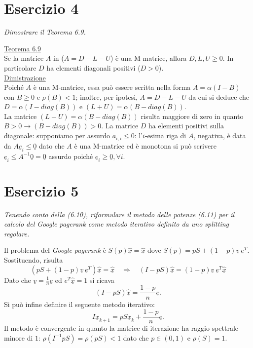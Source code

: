 
\section{Esercizio 4}
\label{sub:es4}
\emph{Dimostrare il Teorema 6.9.}
\begin{sol}
  \underline{Teorema 6.9}\\
  Se la matrice $A$ in ($A=D-L-U$) è una M-matrice, allora $D,L,U\geq 0$.
   In particolare $D$ ha elementi diagonali positivi ($D>0$).\\
  \underline{Dimistrazione}\\
  Poiché $A$ è una M-matrice, essa può essere scritta nella forma $A=\alpha(I-B)$ con $B\geq 0$ e $\rho(B)<1$;
   inoltre, per ipotesi, $A=D-L-U$ da cui si deduce che $D=\alpha(I-diag(B))$ e $(L+U)=\alpha(B-diag(B))$.\\
  La matrice $(L+U)=\alpha(B-diag(B))$ risulta maggiore di zero in quanto $B>0\rightarrow (B-diag(B))>0$.
  La matrice $D$ ha elementi positivi sulla diagonale: supponiamo per assurdo $a_{i,i}\leq 0$:
    l'$i$-esima riga di $A$, negativa, è data da $A\underline{e}_i\leq\underline{0}$ dato che $A$ è una M-matrice ed è monotona si può scrivere
    $\underline{e}_i\leq A^{-1}\underline{0}=\underline{0}$ assurdo poiché $\underline{e}_i\geq\underline{0}, \forall i$.
\end{sol}


\section{Esercizio 5}
\label{sub:es5}
\emph{Tenendo conto della (6.10), riformulare il metodo delle potenze (6.11) per il calcolo del \textit{Google pagerank} come metodo iterativo definito da uno splitting regolare.}
\begin{sol}
  Il problema del \textsl{Google pagerank} è $S(p)\hat{\underline{x}}=\hat{\underline{x}}$ dove $S(p)=pS+(1-p)\underline{v}\:\underline{e}^{T}$. Sostituendo, risulta
   $$(pS+(1-p)\underline{v}\:\underline{e}^{T})\hat{\underline{x}}=\hat{\underline{x}}\quad\Rightarrow\quad (I-pS)\hat{\underline{x}}=(1-p)\underline{v}\:\underline{e}^T\hat{\underline{x}}$$
  Dato che $\underline{v}=\frac{1}{n}\underline{e}$ ed $e^T\hat{\underline{x}}=1$ si ricava
  $$(I-pS)\hat{\underline{x}}=\frac{1-p}{n}\underline{e}.$$
  Si può infine definire il seguente metodo iterativo:
  $$I\underline{x}_{k+1}=pS\underline{x}_k+\dfrac{1-p}{n}\underline{e}.$$
  Il metodo è convergente in quanto la matrice di iterazione ha raggio spettrale minore di $1$: $\rho(I^{-1}pS)=\rho(pS)<1$ dato che $p \in (0,1)$ e $\rho(S)=1$.
\end{sol}

